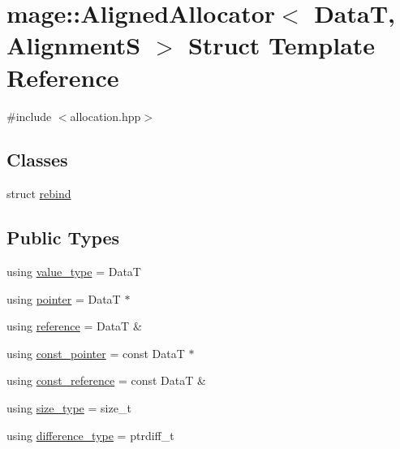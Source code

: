 \hypertarget{structmage_1_1_aligned_allocator}{}\section{mage\+:\+:Aligned\+Allocator$<$ DataT, AlignmentS $>$ Struct Template Reference}
\label{structmage_1_1_aligned_allocator}


{\ttfamily \#include $<$allocation.\+hpp$>$}

\subsection*{Classes}
\begin{DoxyCompactItemize}
\item 
struct \hyperlink{structmage_1_1_aligned_allocator_1_1rebind}{rebind}
\end{DoxyCompactItemize}
\subsection*{Public Types}
\begin{DoxyCompactItemize}
\item 
using \hyperlink{structmage_1_1_aligned_allocator_a04614928948b5589c241726e3441e058}{value\+\_\+type} = DataT
\item 
using \hyperlink{structmage_1_1_aligned_allocator_a4f6b515d4d9d27a8b9e27376302034c4}{pointer} = DataT $\ast$
\item 
using \hyperlink{structmage_1_1_aligned_allocator_a95fd7625632a0143d72ad02ca520be4d}{reference} = DataT \&
\item 
using \hyperlink{structmage_1_1_aligned_allocator_a959cb724f93b205c290ff2ecbd146254}{const\+\_\+pointer} = const DataT $\ast$
\item 
using \hyperlink{structmage_1_1_aligned_allocator_a97c3aca3eba1b0a5a6c68d5c444b36e9}{const\+\_\+reference} = const DataT \&
\item 
using \hyperlink{structmage_1_1_aligned_allocator_a7184b9ffd131938071f9734e9291976e}{size\+\_\+type} = size\+\_\+t
\item 
using \hyperlink{structmage_1_1_aligned_allocator_aa66abd74c38e5e565fca600a066a5915}{difference\+\_\+type} = ptrdiff\+\_\+t
\end{DoxyCompactItemize}
